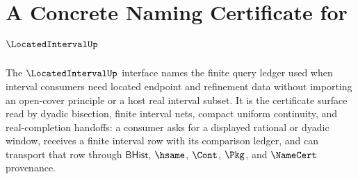 \chapter{A Concrete Naming Certificate for $\LocatedIntervalUp$}
\label{ch:concrete-instances-locatedinterval-namecert}

The $\LocatedIntervalUp$ interface names the finite query ledger used when interval consumers need located endpoint and refinement data without importing an open-cover principle or a host real interval subset. It is the certificate surface read by dyadic bisection, finite interval nets, compact uniform continuity, and real-completion handoffs: a consumer asks for a displayed rational or dyadic window, receives a finite interval row with its comparison ledger, and can transport that row through $\mathsf{BHist}$, $\hsame$, $\Cont$, $\Pkg$, and $\NameCert$ provenance.

